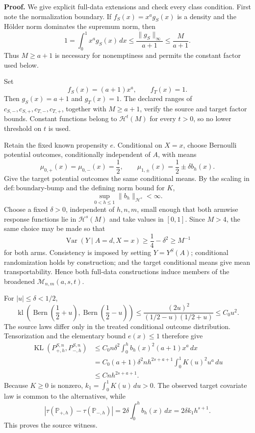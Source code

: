 \textbf{Proof.}
We give explicit full-data extensions and check every class condition. First note the normalization boundary. If \(f_S(x)=x^ag_S(x)\) is a density and the H\"older norm dominates the supremum norm, then
\[
1=\int_0^1x^ag_S(x)\,dx
\le \frac{\lVert g_S\rVert_\infty}{a+1}
\le \frac{M}{a+1}.
\]
Thus \(M\ge a+1\) is necessary for nonemptiness and permits the constant factor used below.

Set
\[
f_S(x)=(a+1)x^a,
\qquad
f_T(x)=1.
\]
Then \(g_S(x)=a+1\) and \(g_T(x)=1\). The declared ranges of \(c_{S,-},c_{S,+},c_{T,-},c_{T,+}\), together with \(M\ge a+1\), verify the source and target factor bounds. Constant functions belong to \(\mathcal H^t(M)\) for every \(t>0\), so no lower threshold on \(t\) is used.

Retain the fixed known propensity \(e\). Conditional on \(X=x\), choose Bernoulli potential outcomes, conditionally independent of \(A\), with means
\[
\mu_{0,+}(x)=\mu_{0,-}(x)=\frac12,
\qquad
\mu_{1,\pm}(x)=\frac12\pm\delta b_h(x).
\]
Give the target potential outcomes the same conditional means. By the scaling in \(\mathrm{def:boundary\text{-}bump}\) and the defining norm bound for \(K\),
\[
\sup_{0<h\le1}\lVert b_h\rVert_{\mathcal H^s}<\infty.
\]
Choose a fixed \(\delta>0\), independent of \(h,n,m\), small enough that both armwise response functions lie in \(\mathcal H^s(M)\) and take values in \([0,1]\). Since \(M>4\), the same choice may be made so that
\[
\operatorname{Var}(Y\mid A=d,X=x)
\ge \frac14-\delta^2
\ge M^{-1}
\]
for both arms. Consistency is imposed by setting \(Y=Y^S(A)\); conditional randomization holds by construction; and the target conditional means give mean transportability. Hence both full-data constructions induce members of the broadened \(\mathcal M_{n,m}(a,s,t)\).

For \(|u|\le\delta<1/2\),
\[
\operatorname{kl}\!\left(\operatorname{Bern}\!\left(\frac12+u\right),
\operatorname{Bern}\!\left(\frac12-u\right)\right)
\le \frac{(2u)^2}{(1/2-u)(1/2+u)}
\le C_0u^2.
\]
The source laws differ only in the treated conditional outcome distribution. Tensorization and the elementary bound \(e(x)\le1\) therefore give
\[
\begin{aligned}
\operatorname{KL}(P_{+,h}^{S,n},P_{-,h}^{S,n})
&\le C_0n\delta^2\int_0^hb_h(x)^2(a+1)x^a\,dx\\
&=C_0(a+1)\delta^2nh^{2s+a+1}
\int_0^1K(u)^2u^a\,du\\
&\le Cnh^{2s+a+1}.
\end{aligned}
\]
Because \(K\ge0\) is nonzero, \(k_1=\int_0^1K(u)\,du>0\). The observed target covariate law is common to the alternatives, while
\[
\left|\tau(\mathbb P_{+,h})-\tau(\mathbb P_{-,h})\right|
=2\delta\int_0^hb_h(x)\,dx
=2\delta k_1h^{s+1}.
\]
This proves the source witness.

